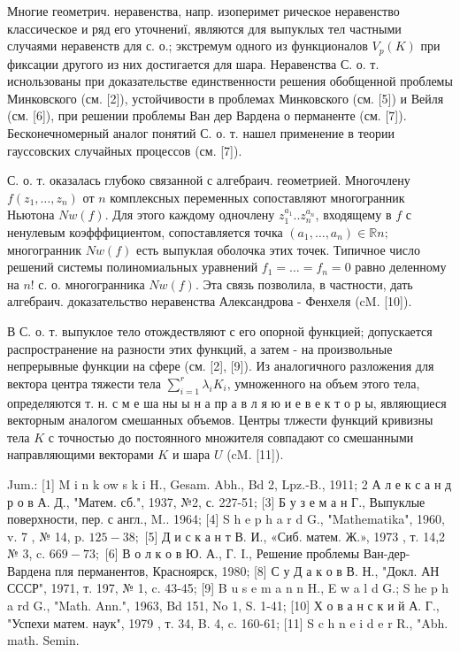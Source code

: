 \documentclass[10pt]{article}
\begin{document}
Многие геометрич. неравенства, напр. изоперимет рическое неравенство классическое и ряд его уточнениї, являются для выпуклых тел частными случаями неравенств для с. о.; экстремум одного из функционалов $V_{p}(K)$ при фиксации другого из них достигается для шара. Неравенства С. о. т. иснользованы при доказательстве единственности решения обобщенной проблемы Минковского (см. [2]), устойчивости в проблемах Минковского (см. [5]) и Вейля (см. [6]), при решении проблемы Ван дер Вардена о перманенте (см. [7]). Бесконечномерный аналог понятий С. о. т. нашел применение в теории гауссовских случайных процессов (см. [7]).



С. о. т. оказалась глубоко связанной с алгебраич. геометрией. Многочлену $f\left(z_{1}, \ldots, z_{n}\right)$ от $n$ комплексных переменных сопоставляют многогранник Ньютона $N w(f)$. Для этого каждому одночлену $z_{1}^{a_{1}} . . z_{n}^{a_{n}}$, входящему в $f$ с ненулевым коэфффициентом, сопоставляется точка $\left(a_{1}, \ldots, a_{n}\right) \in \mathbb{R} n ;$ многогранник $N w(f)$ есть выпуклая оболочка этих точек. Типичное число решений системы полиномиальных уравнений $f_{1}=\ldots=f_{n}=0$ равно деленному на $n !$ с. о. многогранника $N w(f)$. Эта связь позволила, в частности, дать алгебраич. доказательство неравенства Александрова - Фенхеля (cM. [10]).



В С. о. т. выпуклое тело отождествляют с его опорной функцией; допускается распространение на разности этих функций, а затем - на произвольные непрерывные функции на сфере (см. [2], [9]). Из аналогичного разложения для вектора центра тяжести тела $\sum_{i=1}^{r} \lambda_{i} K_{i}$, умноженного на объем этого тела, определяются т. н. с м е ша ны ы н а пр а в л я ю и е в е к т о р ы, являющиеся векторным аналогом смешанных объемов. Центры тлжести функций кривизны тела $K$ с точностью до постоянного множителя совпадают со смешанными направляющими векторами $K$ и шара $U$ (cM. [11]).



Jum.: [1] M i n k ow s k i H., Gesam. Abh., Bd 2, Lpz.-B., 1911; 2 А л е к с а н д р о в А. Д., "Матем. сб.", 1937, №2, с. 227-51; [3] Б у з е м а н Г., Выпуклые поверхности, пер. с англ., M.. 1964; [4] S h e p h a r d G., "Mathematika", 1960, v. 7 , № 14, p. $125-38 ;$ [5] Д и с к а н т В. И., «Сиб. матем. Ж.», 1973 , т. 14,2 № 3, c. $669-73 ;$ [6] В о л к о в Ю. А., Г. I., Решение проблемы Ван-дер-Вардена пля перманентов, Красноярск, 1980; [8] С у Д а к о в В. Н., "Докл. АН СССР", 1971, т. 197, № 1, c. 43-45; [9] B u s e m a n n H., E w a l d G.; S he p h a rd G., "Math. Ann.", 1963, Bd 151, No 1, S. 1-41; [10] Х о в а н с к и й А. Г., "Успехи матем. наук", 1979 , т. 34, B. 4, c. 160-61; [11] S c h n e i d e r R., "Abh. math. Semin.
\end{document}
